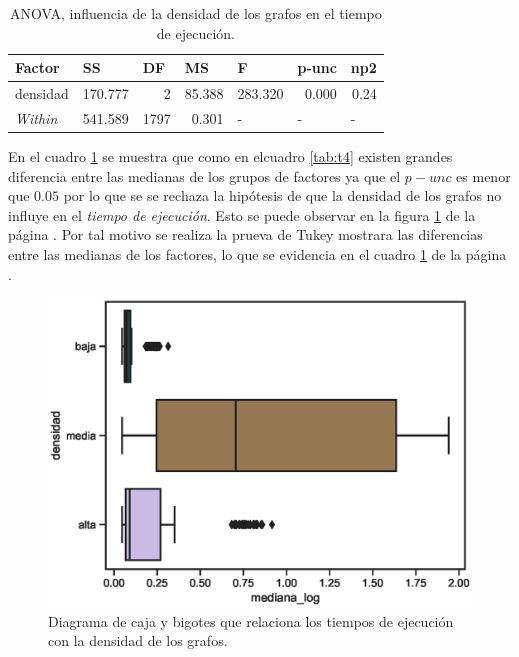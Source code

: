 \documentclass{article}
\begin{document}
\begin{table}[htbp]
  \centering
  \caption{ANOVA, influencia de la densidad de los grafos en el tiempo de ejecución.}
    \begin{tabular}{lrrrlll}
    \toprule
    \textbf{Factor} & \multicolumn{1}{l}{\textbf{SS}} & \multicolumn{1}{l}{\textbf{DF}} & \multicolumn{1}{l}{\textbf{MS}} & \textbf{F} & \textbf{p-unc} & \textbf{np2} \\
    \midrule
    densidad & 170.777 & 2     & 85.388 & \multicolumn{1}{r}{283.320} & \multicolumn{1}{r}{0.000} & \multicolumn{1}{r}{0.24} \\
    \textit{Within} & 541.589 & 1797  & 0.301 & -     & -     & - \\
    \bottomrule
    \end{tabular}%
  \label{tab:t6}%
\end{table}%
En el cuadro \ref{tab:t6} se muestra que como en elcuadro \ref{tab:t4} existen grandes diferencia entre las medianas de los grupos de factores ya que el $p-unc$ es menor que $0.05$ por lo que se se rechaza la hipótesis de que la densidad de los grafos no influye en el \textit{tiempo de ejecución}. Esto se puede observar en la figura \ref{fig8} de la página \pageref{fig8}. Por tal motivo se realiza la prueva de Tukey mostrara las diferencias entre las medianas de los factores, lo que se evidencia en el cuadro \ref{tab:t6} de la página \pageref{tab:t6}. 
\begin{center}
\begin{figure}[htbp]
\includegraphics[scale=0.6]{boxplotdensidad.eps}
\caption{Diagrama de caja y bigotes que relaciona los tiempos de ejecución con la densidad de los grafos.}
\label{fig8}
\end{figure}
\end{center}
\end{document}
